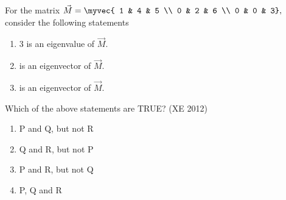 \item For the matrix 
$\vec{M} = \myvec{
1 & 4 & 5 \\ 
0 & 2 & 6 \\ 
0 & 0 & 3}
,$
consider the following statements
\begin{enumerate}[label=\Alph*:, start=16]
\item 3 is an eigenvalue of $\vec{M}$.  
\item {}  is an eigenvector of $\vec{M}$.  
\item {}  is an eigenvector of $\vec{M}$.  
\end{enumerate}
Which of the above statements are TRUE?  
\hfill (XE 2012)
\begin{multicols}{2}
\begin{enumerate}
\item P and Q, but not R  
\item Q and R, but not P  
\item P and R, but not Q  
\item P, Q and R
\end{enumerate}
\end{multicols}


